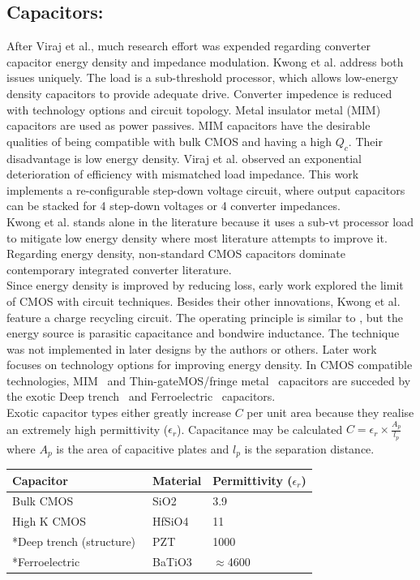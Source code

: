 \documentclass[letterpaper,twocolumn,10pt]{article}
\begin{document}
\subsection{Capacitors: }After Viraj et al.\cite{Viraj2007}, much research effort was expended regarding converter capacitor energy density and impedance modulation. Kwong et al.\cite{Kwong2009} address both issues uniquely. The load is a sub-threshold processor, which allows low-energy density capacitors to provide adequate drive. Converter impedence is reduced with technology options and circuit topology. Metal insulator metal (MIM) capacitors are used as power passives. MIM capacitors have the desirable qualities of being compatible with bulk CMOS and having a high $Q_c$. Their disadvantage is low energy density. Viraj et al.\cite{Viraj2007} observed an exponential deterioration of efficiency with mismatched load impedance. This work implements a re-configurable step-down voltage circuit, where output capacitors can be stacked for 4 step-down voltages or 4 converter impedances.\\
Kwong et al. stands alone in the literature because it uses a sub-vt processor load to mitigate low energy density where most literature attempts to improve it.\\
\indent Regarding energy density, non-standard CMOS capacitors dominate contemporary integrated converter literature.\\
Since energy density is improved by reducing loss, early work explored the limit of CMOS with circuit techniques. Besides their other innovations, Kwong et al.\cite{Kwong2009} feature a charge recycling circuit. The operating principle is similar to \cite{Alimadadi2008}, but the energy source is parasitic capacitance and bondwire inductance. The technique was not implemented in later designs by the authors or others.
\indent Later work focuses on technology options for improving energy density. In CMOS compatible technologies, MIM~\cite{Kwong2009} and Thin-gateMOS/fringe metal~\cite{Pique2012} capacitors are succeded by the exotic Deep trench~\cite{Pique} and Ferroelectric~\cite{Damak2013} capacitors.\\
Exotic capacitor types either greatly increase $C$ per unit area because they realise an extremely high permittivity ($\epsilon_r$). Capacitance may be calculated $C = \epsilon_r \times \frac{A_p}{l_p}$ where $A_p$ is the area of capacitive plates and $l_p$ is the separation distance. 
\begin{table}
    \begin{tabular}{|l|l|l|}
    \hline
    Capacitor               & Material & Permittivity ($\epsilon_r$) \\ \hline
    Bulk CMOS~\cite{Robertson2004}               & SiO2     & 3.9          \\ \hline
    High K CMOS~\cite{Robertson2004}             & HfSiO4   & 11           \\ \hline
    *Deep trench (structure)~\cite{Johari2009} & PZT      & 1000         \\ \hline
    *Ferroelectric~\cite{Lee2004}			& BaTiO3      & $\approx$4600         \\ \hline    
    \end{tabular}
\end{table}
\end{document}
